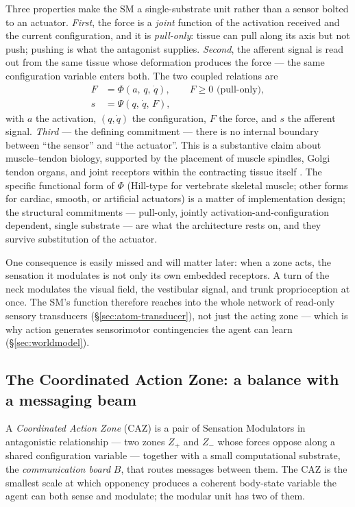 \documentclass{article}
\begin{document}
Three properties make the SM a single-substrate unit rather than a
sensor bolted to an actuator.  \emph{First}, the force is a
\emph{joint} function of the activation received and the current
configuration, and it is \emph{pull-only}: tissue can pull along its
axis but not push; pushing is what the antagonist supplies.
\emph{Second}, the afferent signal is read out from the same tissue
whose deformation produces the force --- the same configuration
variable enters both.  The two coupled relations are
\begin{align}
F &= \Phi(a,\,q,\,\dot q), \qquad F\geq 0 \text{ (pull-only)},
\label{eq:Phi}\\
s &= \Psi(q,\,\dot q,\,F),
\label{eq:Psi}
\end{align}
with $a$ the activation, $(q,\dot q)$ the configuration, $F$ the
force, and $s$ the afferent signal.  \emph{Third} --- the defining
commitment --- there is no internal boundary between ``the sensor''
and ``the actuator''.  This is a substantive claim about
muscle--tendon biology, supported by the placement of muscle spindles,
Golgi tendon organs, and joint receptors within the contracting tissue
itself
\citep{ProskeGandevia2012,TuthillAzim2018ProprioceptionReview}.  The
specific functional form of $\Phi$ (Hill-type for vertebrate skeletal
muscle; other forms for cardiac, smooth, or artificial actuators) is a
matter of implementation design; the structural commitments ---
pull-only, jointly activation-and-configuration dependent, single
substrate --- are what the architecture rests on, and they survive
substitution of the actuator.

One consequence is easily missed and will matter later: when a zone
acts, the sensation it modulates is not only its own embedded
receptors.  A turn of the neck modulates the visual field, the
vestibular signal, and trunk proprioception at once.  The SM's
function therefore reaches into the whole network of read-only sensory
transducers (\S\ref{sec:atom-transducer}), not just the acting zone
--- which is why action generates sensorimotor contingencies the agent
can learn (\S\ref{sec:worldmodel}).

\subsection{The Coordinated Action Zone: a balance with a messaging
beam}\label{sec:atom-caz}

A \emph{Coordinated Action Zone} (CAZ) is a pair of Sensation
Modulators in antagonistic relationship --- two zones $Z_+$ and $Z_-$
whose forces oppose along a shared configuration variable --- together
with a small computational substrate, the \emph{communication board}
$B$, that routes messages between them.  The CAZ is the smallest scale
at which opponency produces a coherent body-state variable the agent
can both sense and modulate; the modular unit has two of them.
\end{document}
